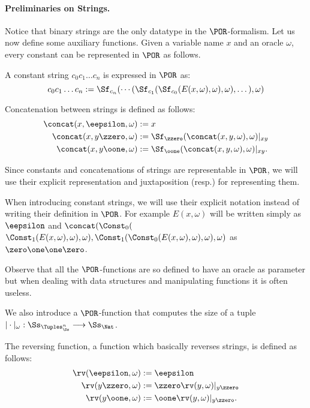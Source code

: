 \paragraph{Preliminaries on Strings.}
Notice that binary strings are the only datatype
in the $\POR$-formalism.
Let us now define some auxiliary functions.
Given a variable name $x$
and an oracle $\omega$,
every constant can be represented in
$\POR$ as follows.


\begin{defn}
A constant string $c_0c_1\dots c_n$
is {expressed} in $\POR$
as:
$$
c_0c_1\dots c_n := \Sf_{c_n}(\cdots(\Sf_{c_1}(
\Sf_{c_0}(E(x,\omega),\omega),\omega),\dots),\omega)
$$
\end{defn}
%
%


\begin{defn}[Concatenation]\label{def:conc}
Concatenation between strings is defined as follows:
\begin{align*}
\concat(x,\eepsilon,\omega) &:= x \\
\concat(x,y\zzero, \omega) &:=
{\Sf_{\zzero}(\concat(x,y,\omega),\omega)|_{xy}} \\
\concat(x,y\oone,\omega) &:=
{\Sf_{\oone}(\concat(x,y,\omega),
\omega)|_{xy}}.
\end{align*}
\end{defn}
%
%
%
\noindent
Since constants and
concatenations
of strings are representable
in $\POR$,
we will use their explicit representation and
juxtaposition (resp.)
for representing them.
\begin{notation}
When introducing constant strings,
we will use their explicit notation instead
of writing their definition in $\POR$.
For example $E(x,\omega)$
will be written simply as $\eepsilon$
and
$\concat(\Const_0($ $\Const_1(E(x,\omega)
{,\omega), \omega)},
\Const_1(\Const_0(E(x,\omega){,\omega),\omega)},
\omega)$ as $\zero\one\one\zero$.
\end{notation}
%
%
Observe that
all the $\POR$-functions are so defined to
have an oracle as parameter but
when dealing with
data structures and manipulating functions
it is often useless.



We also introduce a $\POR$-function that
computes the size of a tuple
{$|\cdot|_\omega
: \Ss_{\Tuples^n_\Ss} \longrightarrow
\Ss_\Nat$}.

\begin{defn}
The reversing function, a function which basically
reverses strings,
is defined as follows:
\begin{align*}
\rv(\eepsilon,\omega) &:= \eepsilon \\
\rv(y\zzero,\omega) &:= \zzero \rv(y,\omega)|_{y\zzero} \\
\rv(y\oone,\omega) &:= \oone \rv(y,\omega)|_{y\zzero}.
\end{align*}
\end{defn}










